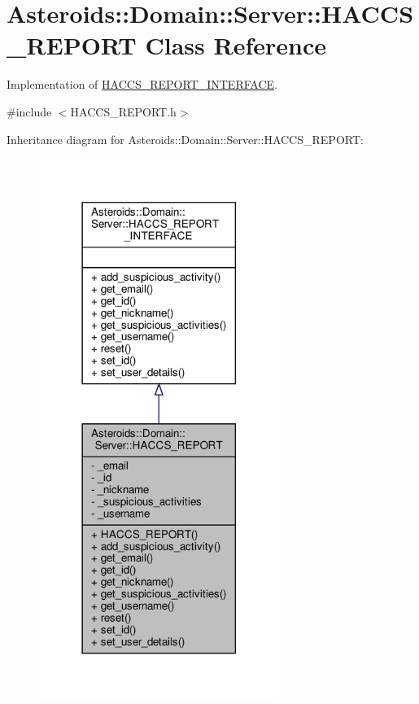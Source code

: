 \hypertarget{classAsteroids_1_1Domain_1_1Server_1_1HACCS__REPORT}{}\section{Asteroids\+:\+:Domain\+:\+:Server\+:\+:H\+A\+C\+C\+S\+\_\+\+R\+E\+P\+O\+RT Class Reference}
\label{classAsteroids_1_1Domain_1_1Server_1_1HACCS__REPORT}


Implementation of \hyperlink{classAsteroids_1_1Domain_1_1Server_1_1HACCS__REPORT__INTERFACE}{H\+A\+C\+C\+S\+\_\+\+R\+E\+P\+O\+R\+T\+\_\+\+I\+N\+T\+E\+R\+F\+A\+CE}.  




{\ttfamily \#include $<$H\+A\+C\+C\+S\+\_\+\+R\+E\+P\+O\+R\+T.\+h$>$}



Inheritance diagram for Asteroids\+:\+:Domain\+:\+:Server\+:\+:H\+A\+C\+C\+S\+\_\+\+R\+E\+P\+O\+RT\+:\nopagebreak
\begin{figure}[H]
\begin{center}
\leavevmode
\includegraphics[width=221pt]{classAsteroids_1_1Domain_1_1Server_1_1HACCS__REPORT__inherit__graph}
\end{center}
\end{figure}


